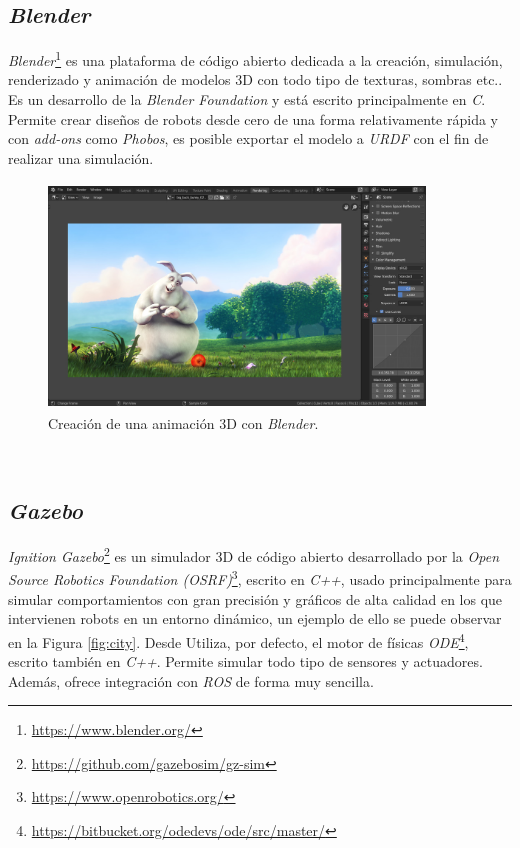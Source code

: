 \subsection{\textit{Blender}}
\label{subsection:blender}
\textit{Blender}\footnote{\url{https://www.blender.org/}} es una plataforma de código abierto dedicada a la creación, simulación, renderizado y animación de modelos 3D con todo tipo de texturas, sombras etc.. Es un desarrollo de la \textit{Blender Foundation} y está escrito principalmente en \textit{C}. Permite crear diseños de robots desde cero de una forma relativamente rápida y con \textit{add-ons} como \textit{Phobos}, es posible exportar el modelo a \textit{URDF} con el fin de realizar una simulación\cite{phobos}.\\

\begin{figure} [h!]
	\begin{center}
		\includegraphics[width=10cm, height=6cm]{figs/blender}
	\end{center}
	\caption{Creación de una animación 3D con \textit{Blender}.}
	\label{fig:blender}
\end{figure}\

\subsection{\textit{Gazebo}}
\label{subsection:gazebo}
\textit{Ignition Gazebo}\footnote{\url{https://github.com/gazebosim/gz-sim}} es un simulador 3D de código abierto desarrollado por la \textit{Open Source Robotics Foundation (OSRF)}\footnote{\url{https://www.openrobotics.org/}}, escrito en \textit{C++}, usado principalmente para simular comportamientos con gran precisión y gráficos de alta calidad en los que intervienen robots en un entorno dinámico, un ejemplo de ello se puede observar en la Figura \ref{fig:city}. Desde  Utiliza, por defecto, el motor de físicas \textit{ODE}\footnote{\url{https://bitbucket.org/odedevs/ode/src/master/}}, escrito también en \textit{C++}. Permite simular todo tipo de sensores y actuadores. Además, ofrece integración con \textit{ROS} de forma muy sencilla.\\

